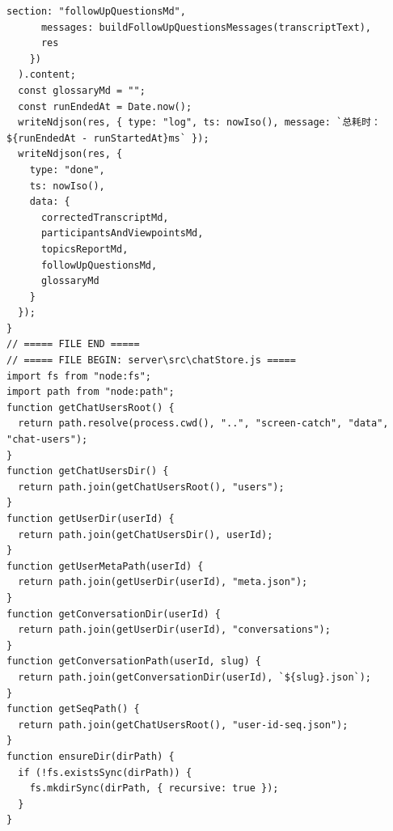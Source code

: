 \documentclass[12pt,a4paper]{article}
\begin{document}
\newpage
{}
\fancyhead[R]{}
\begin{Verbatim}[fontsize=\footnotesize]
      section: "followUpQuestionsMd",
      messages: buildFollowUpQuestionsMessages(transcriptText),
      res
    })
  ).content;
  const glossaryMd = "";
  const runEndedAt = Date.now();
  writeNdjson(res, { type: "log", ts: nowIso(), message: `总耗时：${runEndedAt - runStartedAt}ms` });
  writeNdjson(res, {
    type: "done",
    ts: nowIso(),
    data: {
      correctedTranscriptMd,
      participantsAndViewpointsMd,
      topicsReportMd,
      followUpQuestionsMd,
      glossaryMd
    }
  });
}
// ===== FILE END =====
// ===== FILE BEGIN: server\src\chatStore.js =====
import fs from "node:fs";
import path from "node:path";
function getChatUsersRoot() {
  return path.resolve(process.cwd(), "..", "screen-catch", "data", "chat-users");
}
function getChatUsersDir() {
  return path.join(getChatUsersRoot(), "users");
}
function getUserDir(userId) {
  return path.join(getChatUsersDir(), userId);
}
function getUserMetaPath(userId) {
  return path.join(getUserDir(userId), "meta.json");
}
function getConversationDir(userId) {
  return path.join(getUserDir(userId), "conversations");
}
function getConversationPath(userId, slug) {
  return path.join(getConversationDir(userId), `${slug}.json`);
}
function getSeqPath() {
  return path.join(getChatUsersRoot(), "user-id-seq.json");
}
function ensureDir(dirPath) {
  if (!fs.existsSync(dirPath)) {
    fs.mkdirSync(dirPath, { recursive: true });
  }
}
\end{Verbatim}
\newpage
{}
\fancyhead[R]{}
\end{document}
